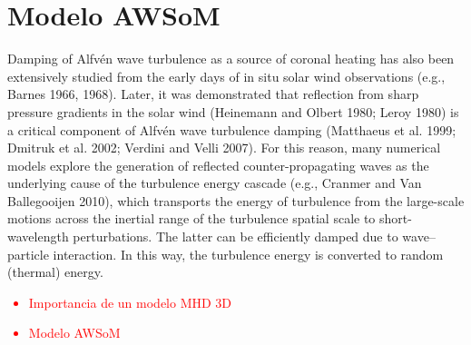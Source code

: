 \section{Modelo AWSoM}
Damping of Alfvén wave turbulence as a source of coronal heating has also been extensively studied from the early days of in situ solar wind observations (e.g., Barnes 1966, 1968). Later, it was demonstrated that reflection from sharp pressure gradients in the solar wind (Heinemann and Olbert 1980; Leroy 1980) is a critical component of Alfvén wave turbulence damping (Matthaeus et al. 1999; Dmitruk et al. 2002; Verdini and Velli 2007). For this reason, many numerical models explore the generation of reflected counter-propagating waves as the underlying cause of the turbulence energy cascade (e.g., Cranmer and Van Ballegooijen 2010), which transports the energy of turbulence from the large-scale motions across the inertial range of the turbulence spatial scale to short-wavelength perturbations. The latter can be efficiently damped due to wave–particle interaction. In this way, the turbulence energy is converted to random (thermal) energy.
\textcolor{red}{
\begin{itemize}
  \item Importancia de un modelo MHD 3D
  \item Modelo AWSoM
\end{itemize}
}





